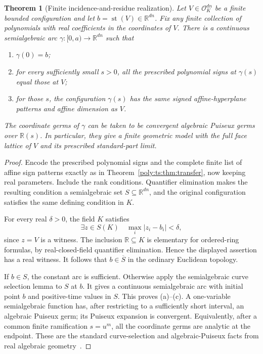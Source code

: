 \documentclass[11pt,a4paper]{article}
\numberwithin{equation}{section}
\newtheorem{theorem}{Theorem}[section]
\theoremstyle{plain}
\newcommand{\R}{\mathbb R}
\newcommand{\st}{\operatorname{st}}
\newcommand{\cO}{\mathcal{O}}
\begin{document}
\begin{theorem}[Finite incidence-and-residue realization]\label{poly:ts:thm:puiseux}
Let $V\in\cO_K^{dn}$ be a finite bounded configuration and let
$b=\st(V)\in\R^{dn}$. Fix any finite collection of polynomials with real
coefficients in the coordinates of $V$. There is a continuous
semialgebraic arc $\gamma:[0,a)\to\R^{dn}$ such that
\begin{enumerate}[label=(\alph*)]
\item $\gamma(0)=b$;
\item for every sufficiently small $s>0$, all the prescribed polynomial
signs at $\gamma(s)$ equal those at $V$;
\item for those $s$, the configuration $\gamma(s)$ has the same signed
affine-hyperplane patterns and affine dimension as $V$.
\end{enumerate}
The coordinate germs of $\gamma$ can be taken to be convergent algebraic
Puiseux germs over $\R(s)$. In particular, they give a finite geometric
model with the full face lattice of $V$ and its prescribed standard-part
limit.
\end{theorem}
\begin{proof}
Encode the prescribed polynomial signs and the complete finite list of
affine sign patterns exactly as in Theorem~\ref{poly:ts:thm:transfer}, now keeping
real parameters. Include the rank conditions. Quantifier elimination makes
the resulting condition a semialgebraic set $S\subseteq\R^{dn}$, and the
original configuration satisfies the same defining condition in $K$.

For every real $\delta>0$, the field $K$ satisfies
\[
 \exists z\in S(K)\quad \max_i|z_i-b_i|<\delta,
\]
since $z=V$ is a witness. The inclusion $\R\subseteq K$ is elementary
for ordered-ring formulas, by real-closed-field quantifier elimination.
Hence the displayed assertion has a real witness. It follows that
$b\in\overline S$ in the ordinary Euclidean topology.

If $b\in S$, the constant arc is sufficient. Otherwise apply the
semialgebraic curve selection lemma to $S$ at $b$. It gives a continuous
semialgebraic arc with initial point $b$ and positive-time values in $S$.
This proves (a)--(c). A one-variable semialgebraic function has, after
restricting to a sufficiently short interval, an algebraic Puiseux germ;
its Puiseux expansion is convergent. Equivalently, after a common finite
ramification $s=u^m$, all the coordinate germs are analytic at the
endpoint. These are the standard curve-selection and algebraic-Puiseux
facts from real algebraic geometry~\cite{ts:BCR,fs:BR}.
\end{proof}
\end{document}
